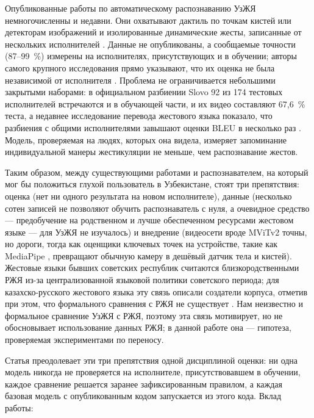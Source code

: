 \documentclass[a4paper,fleqn]{cas-dc}
\begin{document}
Опубликованные работы по автоматическому распознаванию УзЖЯ немногочисленны и недавни. Они охватывают дактиль по точкам кистей или детекторам изображений \cite{2026_jovlieva_webcam_uzbek_fingerspelling, 2024_kayumov_uzsl_latin_angular_signs, 2024_akhmedov_uzsl_dactyl_yolo} и изолированные динамические жесты, записанные от нескольких исполнителей \cite{2026_ergashev_cnnlstm_vs_squeezeformer_uzsl, 2025_akkomron_uzslr_isolated_dynamic}. Данные не опубликованы, а сообщаемые точности (87--99~\%) измерены на исполнителях, присутствующих и в обучении; авторы самого крупного исследования прямо указывают, что их оценка не была независимой от исполнителя \cite{2026_ergashev_cnnlstm_vs_squeezeformer_uzsl}. Проблема не ограничивается небольшими закрытыми наборами: в официальном разбиении Slovo 92 из 174 тестовых исполнителей встречаются и в обучающей части, и их видео составляют 67,6~\% теста, а недавнее исследование перевода жестового языка показало, что разбиения с общими исполнителями завышают оценки BLEU в несколько раз \cite{2026_artiaga_signer_dependence_slt}. Модель, проверяемая на людях, которых она видела, измеряет запоминание индивидуальной манеры жестикуляции не меньше, чем распознавание жестов.

Таким образом, между существующими работами и распознавателем, на который мог бы положиться глухой пользователь в Узбекистане, стоят три препятствия: оценка (нет ни одного результата на новом исполнителе), данные (несколько сотен записей не позволяют обучить распознаватель с нуля, а очевидное средство --- предобучение на родственном и лучше обеспеченном ресурсами жестовом языке --- для УзЖЯ не изучалось) и внедрение (видеосети вроде MViTv2 \cite{2022_li_mvitv2} точны, но дороги, тогда как оценщики ключевых точек на устройстве, такие как MediaPipe \cite{2020_zhang_mediapipe_hands, docs_mediapipe_holistic_landmarker}, превращают обычную камеру в дешёвый датчик тела и кистей). Жестовые языки бывших советских республик считаются близкородственными РЖЯ из-за централизованной языковой политики советского периода; для казахско-русского жестового языка эту связь описали создатели корпуса, отметив при этом, что формального сравнения с РЖЯ не существует \cite{2020_imashev_krsl_dataset, 2024_imashev_krsl_retrospective}. Нам неизвестно и формальное сравнение УзЖЯ с РЖЯ, поэтому эта связь мотивирует, но не обосновывает использование данных РЖЯ; в данной работе она --- гипотеза, проверяемая экспериментами по переносу.

Статья преодолевает эти три препятствия одной дисциплиной оценки: ни одна модель никогда не проверяется на исполнителе, присутствовавшем в обучении, каждое сравнение решается заранее зафиксированным правилом, а каждая базовая модель с опубликованным кодом запускается из этого кода. Вклад работы:
\end{document}
